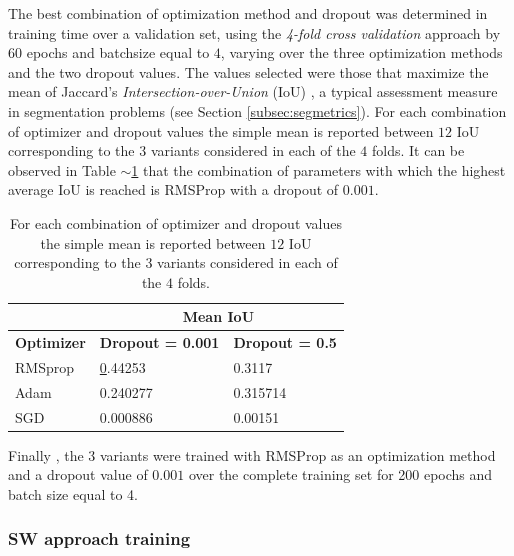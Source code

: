 \documentclass[a4paper,authoryear,review]{elsarticle}
\begin{document}
	The best combination of optimization method and dropout was determined in training time over a validation set, using the \emph{4-fold cross validation} approach by 60 epochs and batchsize equal to $4$, varying over the three optimization methods and the two dropout values. The values selected were those that maximize the mean of Jaccard's \emph{Intersection-over-Union} (IoU) \citep{jaccard1912distribution}, a typical assessment measure in segmentation problems (see Section \ref{subsec:segmetrics}). For each combination of optimizer and dropout values the simple mean is reported between $12$ IoU corresponding to the $3$ variants considered in each of the $4$ folds. It can be observed in Table $\sim$\ref{tab:Table2} that the combination of parameters with which the highest average IoU is reached is RMSProp with a dropout of $0.001$. 
	
	\begin{table}[]
		\centering
		\begin{tabular}{lll}
			\hline
			\multicolumn{1}{|l|}{} & \multicolumn{2}{c|}{\textbf{Mean IoU}} \\ \hline
			\multicolumn{1}{|c|}{\textbf{Optimizer}} & \multicolumn{1}{c|}{\textbf{Dropout = 0.001}} & \multicolumn{1}{c|}{\textbf{Dropout = 0.5}} \\ \hline
			RMSprop & {\ul 0.44253} & 0.3117 \\
			Adam & 0.240277 & 0.315714 \\
			SGD & 0.000886 & 0.00151 \\ \hline
		\end{tabular}%
		\caption{
			For each combination of optimizer and dropout values the simple mean is reported between $12$ IoU corresponding to the $3$ variants considered in each of the $4$ folds.
		}
		\label{tab:Table2}
	\end{table}
	
	Finally , the 3 variants were trained with RMSProp as an optimization method and a dropout value of $0.001$ over the complete training set for 200 epochs and batch size equal to 4.
	
	\subsubsection{SW approach training}
	\label{sec:swtrain}
	
\end{document}
